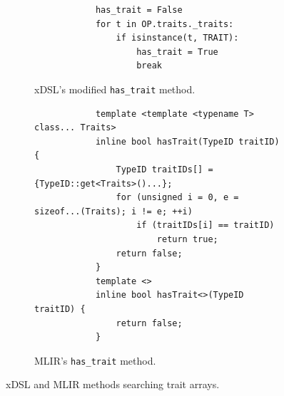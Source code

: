 \begin{figure}[H]
    \centering
    \begin{subfigure}[b]{0.45\textwidth}
       \centering
        \begin{verbatim}
            has_trait = False
            for t in OP.traits._traits:
                if isinstance(t, TRAIT):
                    has_trait = True
                    break
        \end{verbatim}
        \footnotesize\vspace{5.5em}
        \captionsetup{name=Listing}
        \caption{xDSL's modified \texttt{has_trait} method.}
        \label{listing:ubenchmark-trait-checks-both-xdsl}
    \end{subfigure}
    \hfill
    \begin{subfigure}[b]{0.45\textwidth}
        \centering
        \begin{verbatim}
            template <template <typename T> class... Traits>
            inline bool hasTrait(TypeID traitID) {
                TypeID traitIDs[] = {TypeID::get<Traits>()...};
                for (unsigned i = 0, e = sizeof...(Traits); i != e; ++i)
                    if (traitIDs[i] == traitID)
                        return true;
                return false;
            }
            template <>
            inline bool hasTrait<>(TypeID traitID) {
                return false;
            }
        \end{verbatim}
        \captionsetup{name=Listing}
        \caption{MLIR's \texttt{has_trait} method.}
        \label{listing:ubenchmark-trait-checks-both-mlir}
    \end{subfigure}
    \vspace{1em}
    \captionsetup{name=Listing}
    \caption{xDSL and MLIR methods searching trait arrays.}
    \label{listing:ubenchmark-trait-checks-both}
\end{figure}

